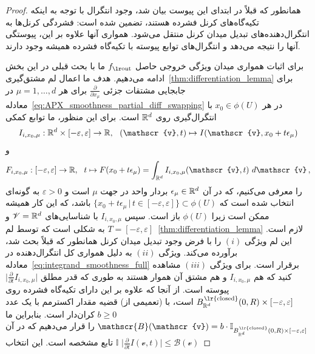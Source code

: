 \begin{proof}
    همانطور که قبلاً در ابتدای این پیوست بیان شد، وجود انتگرال با توجه به اینکه تکیه‌گاه‌های کرنل فشرده هستند، تضمین شده است:
    فشردگی کرنل‌ها به انتگرال‌دهنده‌های تبدیل میدان کرنل منتقل می‌شود.
    همواری آنها علاوه بر این، پیوستگی آنها را نتیجه می‌دهد و انتگرال‌های توابع پیوسته با تکیه‌گاه فشرده همیشه وجود دارند.

    برای اثبات همواری میدان ویژگی خروجی حاصل $\fout$ ما با بحث قبلی در این بخش ادامه می‌دهیم.
    هدف ما اعمال لم مشتق‌گیری~\ref{thm:differentiation_lemma} برای جابجایی مشتقات جزئی $\frac{\partial}{\partial x_\mu}$ برای هر $\mu=1,\dots,d$ در معادله~\eqref{eq:APX_smoothness_partial_diff_swapping} در هر $x_0 \in \phi(U)$ با انتگرال‌گیری روی $\mathbb{R}^d$ است.
    برای این منظور، ما توابع کمکی
    \begin{align}
        I_{i,x_0,\mu}: \R^d \times [-\varepsilon,\varepsilon] \to \R,\ \ (\mathscr{v},t) \mapsto I(\mathscr{v}, x_0 + t\epsilon_\mu)
    \end{align}
    و
    \begin{align}
        F_{i,x_0,\mu}: [-\varepsilon,\varepsilon] \to \R,\ \ t \mapsto F(x_0 + t\epsilon_\mu) = \int_{\R^d} I_{i,x_0,\mu}(\mathscr{v},t)\ d\mathscr{v} \,,
    \end{align}
    را معرفی می‌کنیم، که در آن $\epsilon_\mu \in \mathbb{R}^d$ بردار واحد در جهت $\mu$ است و
    $\varepsilon > 0$ به گونه‌ای انتخاب شده است که $\big\{ x_0 + t\epsilon_\mu \,\big|\, t\in [-\varepsilon,\varepsilon] \big\} \subset \phi(U)$ باشد، که این کار همیشه ممکن است زیرا $\phi(U)$ باز است.
    سپس $I_{i,x_0,\mu}$ با شناسایی‌های $\mathscr{V}=\mathbb{R}^d$ و $T=[-\varepsilon,\varepsilon]$ به شکلی است که توسط لم~\ref{thm:differentiation_lemma} لازم است.
    این لم ویژگی $(i)$ را با فرض وجود تبدیل میدان کرنل همانطور که قبلاً بحث شد، برآورده می‌کند.
    ویژگی $(ii)$ به دلیل همواری کل انتگرال‌دهنده در معادله~\eqref{eq:integrand_smoothness_full} برقرار است.
    برای ویژگی $(iii)$ مشاهده کنید که هم $I_{i,x_0,\mu}$ و هم مشتق آن هموار هستند به طوری که قدر مطلق $\big| \frac{\partial}{\partial t} I_{i,x_0,\mu} \big|$ پیوسته است.
    از آنجا که علاوه بر این دارای تکیه‌گاه فشرده روی $B_{\R^d}^{\mkern1.5mu\textup{\lr{closed}}}(0,R) \times [-\varepsilon,\varepsilon]$ است، با (تعمیمی از) قضیه مقدار اکسترمم با یک عدد $b\geq0$ کران‌دار است.
    بنابراین ما $\mathscr{B}(\mathscr{v}) = b\cdot \mathbb{I}_{B_{\R^d}^{\mkern1.5mu\textup{\lr{closed}}}(0,R) \times [-\varepsilon,\varepsilon]}$ را قرار می‌دهیم که در آن $\mathbb{I}$ تابع مشخصه است.
    این انتخاب
    $\big| \frac{\partial}{\partial t} I(\mathscr{v},t) \big| \leq \mathscr{B}(\mathscr{v})$

\end{proof}
